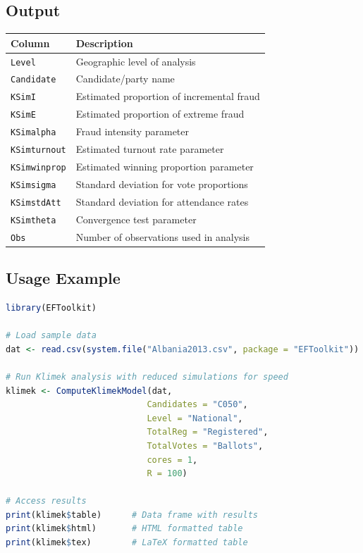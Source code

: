 \documentclass{article}
\begin{document}
\subsection{Output}
\begin{longtable}{p{4cm}p{10cm}}
\toprule
\textbf{Column} & \textbf{Description} \\
\midrule
\texttt{Level} & Geographic level of analysis \\
\texttt{Candidate} & Candidate/party name \\
\texttt{KSimI} & Estimated proportion of incremental fraud \\
\texttt{KSimE} & Estimated proportion of extreme fraud \\
\texttt{KSimalpha} & Fraud intensity parameter \\
\texttt{KSimturnout} & Estimated turnout rate parameter \\
\texttt{KSimwinprop} & Estimated winning proportion parameter \\
\texttt{KSimsigma} & Standard deviation for vote proportions \\
\texttt{KSimstdAtt} & Standard deviation for attendance rates \\
\texttt{KSimtheta} & Convergence test parameter \\
\texttt{Obs} & Number of observations used in analysis \\
\bottomrule
\end{longtable}

\subsection{Usage Example}
\begin{lstlisting}[language=R]
library(EFToolkit)

# Load sample data
dat <- read.csv(system.file("Albania2013.csv", package = "EFToolkit"))

# Run Klimek analysis with reduced simulations for speed
klimek <- ComputeKlimekModel(dat, 
                            Candidates = "C050", 
                            Level = "National",
                            TotalReg = "Registered", 
                            TotalVotes = "Ballots", 
                            cores = 1, 
                            R = 100)

# Access results
print(klimek$table)      # Data frame with results
print(klimek$html)       # HTML formatted table
print(klimek$tex)        # LaTeX formatted table
\end{lstlisting}
\end{document}

